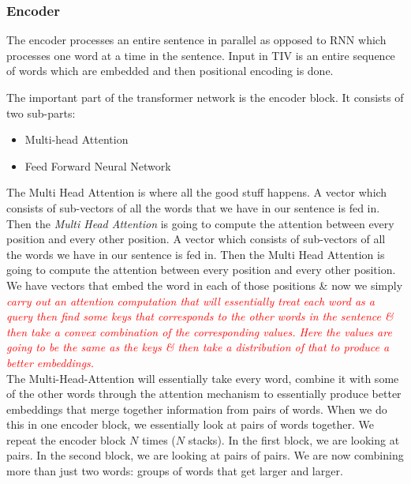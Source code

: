 \documentclass{article}
\begin{document}
\subsubsection{Encoder}
The encoder processes an entire sentence in parallel as opposed to RNN which processes one word at a time in the sentence. Input in TIV is an entire sequence of words which are embedded and then positional encoding is done.
\begin{minipage}{0.6\textwidth}

\end{minipage}
\begin{minipage}{0.5\textwidth}
The important part of the transformer network is the encoder block. It consists of two sub-parts:
\begin{itemize}
    \item Multi-head Attention
    \item Feed Forward Neural Network
\end{itemize}
\end{minipage}
The Multi Head Attention is where all the good stuff happens. A vector which consists of sub-vectors of all the words that we have in our sentence is fed in.  Then the \textit{Multi Head Attention} is going to compute the attention between every position and every other position. A vector which consists of sub-vectors of all the words we have in our sentence is fed in. Then the Multi Head Attention is going to compute the attention between every position and every other position. \\
We have vectors that embed the word in each of those positions \& now we simply \textit{\textcolor{red}{carry out an attention computation that will essentially treat each word as a query then find some keys that corresponds to the other words in the sentence \& then take a convex combination of the corresponding values. Here the values are going to be the same as the keys \& then take a distribution of that to produce a better embeddings.}} \\
The Multi-Head-Attention will essentially take every word, combine it with some of the other words through the attention mechanism to essentially produce better embeddings that merge together information from pairs of words. When we do this in one encoder block, we essentially look at pairs of words together. We repeat the encoder block $N$ times ($N$ stacks). In the first block, we are looking at pairs. In the second block, we are looking at pairs of pairs.  We are now combining more than just two words: groups of words that get larger and larger. \\
\end{document}

